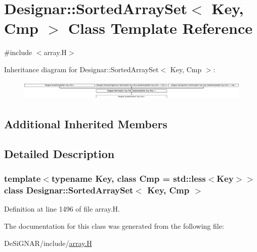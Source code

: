 \hypertarget{class_designar_1_1_sorted_array_set}{}\section{Designar\+:\+:Sorted\+Array\+Set$<$ Key, Cmp $>$ Class Template Reference}
\label{class_designar_1_1_sorted_array_set}


{\ttfamily \#include $<$array.\+H$>$}

Inheritance diagram for Designar\+:\+:Sorted\+Array\+Set$<$ Key, Cmp $>$\+:\begin{figure}[H]
\begin{center}
\leavevmode
\includegraphics[height=0.942761cm]{class_designar_1_1_sorted_array_set}
\end{center}
\end{figure}
\subsection*{Additional Inherited Members}


\subsection{Detailed Description}
\subsubsection*{template$<$typename Key, class Cmp = std\+::less$<$\+Key$>$$>$\newline
class Designar\+::\+Sorted\+Array\+Set$<$ Key, Cmp $>$}



Definition at line 1496 of file array.\+H.



The documentation for this class was generated from the following file\+:\begin{DoxyCompactItemize}
\item 
De\+Si\+G\+N\+A\+R/include/\hyperlink{array_8_h}{array.\+H}\end{DoxyCompactItemize}

